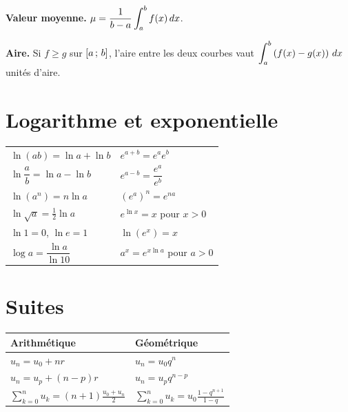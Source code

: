 \smallskip
\noindent
\textbf{Valeur moyenne.} $\mu = \dfrac{1}{b-a}\displaystyle\int_{a}^{b}f(x)\,dx$.

\smallskip
\noindent
\textbf{Aire.} Si $f \geq g$ sur $\left[a\,;\,b\right]$, l'aire entre les deux
courbes vaut $\displaystyle\int_{a}^{b}\left(f(x)-g(x)\right)\,dx$ unités
d'aire.

\section*{Logarithme et exponentielle}

\begin{center}
\setlength{\tabcolsep}{10pt}
\renewcommand{\arraystretch}{1.5}
\begin{tabular}{@{}ll@{}}
\toprule
$\ln(ab) = \ln a+\ln b$ & $e^{a+b} = e^{a}e^{b}$ \\
$\ln\dfrac ab = \ln a-\ln b$ & $e^{a-b} = \dfrac{e^{a}}{e^{b}}$ \\
$\ln\!\left(a^{n}\right) = n\ln a$ & $\left(e^{a}\right)^{n} = e^{na}$ \\
$\ln\sqrt a = \frac12\ln a$ & $e^{\ln x} = x$ pour $x>0$ \\
$\ln 1 = 0$, $\ln e = 1$ & $\ln\!\left(e^{x}\right) = x$ \\
$\log a = \dfrac{\ln a}{\ln 10}$ & $a^{x} = e^{x\ln a}$ pour $a>0$ \\
\bottomrule
\end{tabular}
\end{center}

\section*{Suites}

\begin{center}
\setlength{\tabcolsep}{10pt}
\renewcommand{\arraystretch}{1.6}
\begin{tabular}{@{}ll@{}}
\toprule
Arithmétique & Géométrique \\
\midrule
$u_{n} = u_{0}+nr$ & $u_{n} = u_{0}q^{n}$ \\
$u_{n} = u_{p}+(n-p)r$ & $u_{n} = u_{p}q^{n-p}$ \\
$\displaystyle\sum_{k=0}^{n}u_{k} = (n+1)\frac{u_{0}+u_{n}}{2}$ &
$\displaystyle\sum_{k=0}^{n}u_{k} = u_{0}\frac{1-q^{n+1}}{1-q}$ \\
\bottomrule
\end{tabular}
\end{center}

